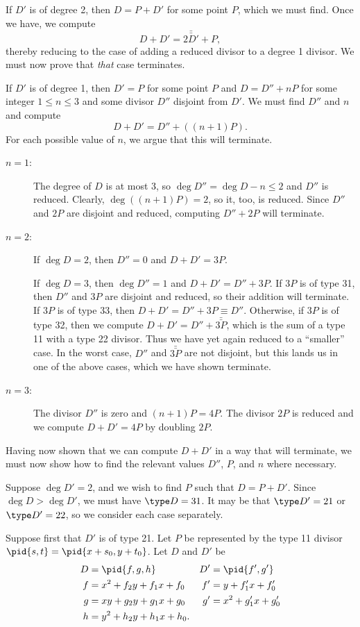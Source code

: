 If $D'$ is of degree 2, then $D = P + D'$ for some point $P$, which we must find.
Once we have, we compute
  \[ D + D' = \bar{\bar{2D'}} + P, \]
thereby reducing to the case of adding a reduced divisor to a degree 1 divisor.
We must now prove that \emph{that} case terminates.

If $D'$ is of degree 1, then $D' = P$ for some point $P$ and $D = D'' + nP$ for some integer $1 \leq n \leq 3$ and some divisor $D''$ disjoint from $D'$.
We must find $D''$ and $n$ and compute
  \[ D + D' = D'' + ((n + 1)P). \]
For each possible value of $n$, we argue that this will terminate.
\begin{description}
  \item[$n = 1$:]
    The degree of $D$ is at most 3, so $\deg D'' = \deg D - n \leq 2$ and $D''$ is reduced.
    Clearly, $\deg((n + 1)P) = 2$, so it, too, is reduced.
    Since $D''$ and $2P$ are disjoint and reduced, computing $D'' + 2P$ will terminate.
  \item[$n = 2$:]
    If $\deg D = 2$, then $D'' = 0$ and $D + D' = 3P$.
    
    If $\deg D = 3$, then $\deg D'' = 1$ and $D + D' = D'' + 3P$.
    If $3P$ is of type 31, then $D''$ and $3P$ are disjoint and reduced, so their addition will terminate.
    If $3P$ is of type 33, then $D + D' = D'' + 3P \equiv D''$.
    Otherwise, if $3P$ is of type 32, then we compute $D + D' = D'' + \bar{\bar{3P}}$,
    which is the sum of a type 11 with a type 22 divisor.
    Thus we have yet again reduced to a ``smaller'' case.
    In the worst case, $D''$ and $\bar{\bar{3P}}$ are not disjoint,
    but this lands us in one of the above cases, which we have shown terminate.
  \item[$n = 3$:]
    The divisor $D''$ is zero and $(n + 1)P = 4P$.
    The divisor $2P$ is reduced and we compute $D + D' = 4P$ by doubling $2P$.
\end{description}

Having now shown that we can compute $D + D'$ in a way that will terminate,
we must now show how to find the relevant values $D''$, $P$, and $n$ where necessary.

Suppose $\deg D' = 2$, and we wish to find $P$ such that $D = P + D'$.
Since $\deg D > \deg D'$, we must have $\type D = 31$.
It may be that $\type D' = 21$ or $\type D' = 22$, so we consider each case separately.

Suppose first that $D'$ is of type 21. 
Let $P$ be represented by the type 11 divisor $\pid{s, t} = \pid{x + s_0, y + t_0}$.
Let $D$ and $D'$ be
\begin{align*}
  D &= \pid{f, g, h} & D' &= \pid{f', g'} \\
  f &= x^2 + f_2y + f_1x + f_0 & f' &= y + f'_1x + f'_0 \\
  g &= xy + g_2y + g_1x + g_0 & g' &= x^2 + g'_1x + g'_0 \\
  h &= y^2 + h_2y + h_1x + h_0.
\end{align*}

